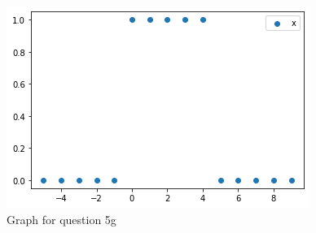 \documentclass[letterpaper, reqno,11pt]{article}
\begin{document}
\begin{figure}[htbp]
\centering
\includegraphics[width=\textwidth]{5gii}
\caption{Graph for question 5g}
\label{fig:5gii}
\end{figure}
\end{document}
